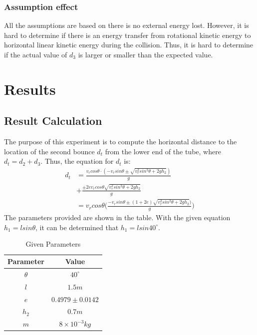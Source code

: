 \documentclass{article}
\begin{document}
        \subsubsection{Assumption effect}
            All the assumptions are based on there is no external energy lost. However, it is hard to determine if there is an energy transfer from rotational kinetic energy to horizontal linear kinetic energy during the collision. Thus, it is hard to determine if the actual value of $d_3$ is larger or smaller than the expected value.
\section{Results}
    \subsection{Result Calculation}
            The purpose of this experiment is to compute the horizontal distance to the location of the second bounce $d_t$ from the lower end of the tube, where $d_t = d_2 + d_3$. Thus, the equation for $d_t$ is:
            \begin{equation}\label{d_t}
                \begin{aligned}
                    d_t &= \frac{v_rcos\theta \cdot (-v_{r}sin\theta\pm\sqrt{{v^2_{r}sin^2\theta}+2gh_2})}{g}\\&+\frac{\pm2ev_rcos\theta\sqrt{{v^2_{r}sin^2\theta}+2gh_2}}{g} \\
                    &= v_rcos\theta \Big(\frac{-v_rsin\theta\pm(1+2e)\sqrt{{v^2_{r}sin^2\theta}+2gh_2})}{g}\Big)
                \end{aligned}
            \end{equation}
            The parameters provided are shown in the table. With the given equation $h_1 = lsin\theta$, it can be determined that $h_1 = lsin40^\circ$.
            \begin{table}[H]
                \caption {Given Parameters} \label{parameters} 
                \begin{center}
                    \begin{tabular}{cc}
                        \hline
                        Parameter & Value \\
                        \hline
                        $\theta$     & $40^\circ$     \\
                        $l$         & $1.5m$     \\
                        $e$         & $0.4979 \pm 0.0142$     \\
                        $h_2$        & $0.7m$     \\
                        $m$         & $8\times10^{-3}kg$     \\
                        \hline
                    \end{tabular}
                \end{center}
            \end{table}
\end{document}
